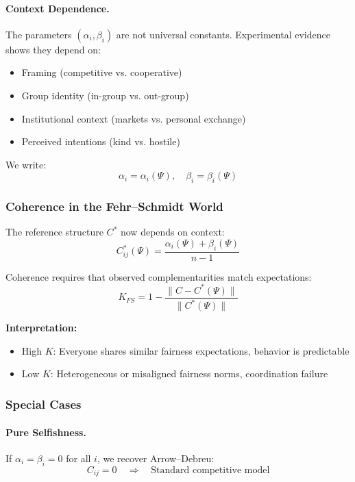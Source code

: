 \paragraph{Context Dependence.}
The parameters $(\alpha_i, \beta_i)$ are not universal constants.
Experimental evidence shows they depend on:
\begin{itemize}
  \item Framing (competitive vs. cooperative)
  \item Group identity (in-group vs. out-group)
  \item Institutional context (markets vs. personal exchange)
  \item Perceived intentions (kind vs. hostile)
\end{itemize}

We write:
\begin{equation}
  \alpha_i = \alpha_i(\Psi), \quad \beta_i = \beta_i(\Psi)
  \label{eq:fscontext}
\end{equation}

\subsubsection{Coherence in the Fehr--Schmidt World}

The reference structure $C^*$ now depends on context:
\begin{equation}
  C^*_{ij}(\Psi) = \frac{\alpha_i(\Psi) + \beta_i(\Psi)}{n-1}
\end{equation}

Coherence requires that observed complementarities match expectations:
\begin{equation}
  K_{FS} = 1 - \frac{\|C - C^*(\Psi)\|}{\|C^*(\Psi)\|}
\end{equation}

\textbf{Interpretation:}
\begin{itemize}
  \item High $K$: Everyone shares similar fairness expectations, behavior is predictable
  \item Low $K$: Heterogeneous or misaligned fairness norms, coordination failure
\end{itemize}

\subsubsection{Special Cases}

\paragraph{Pure Selfishness.}
If $\alpha_i = \beta_i = 0$ for all $i$, we recover Arrow--Debreu:
\begin{equation}
  C_{ij} = 0 \quad \Rightarrow \quad \text{Standard competitive model}
\end{equation}

